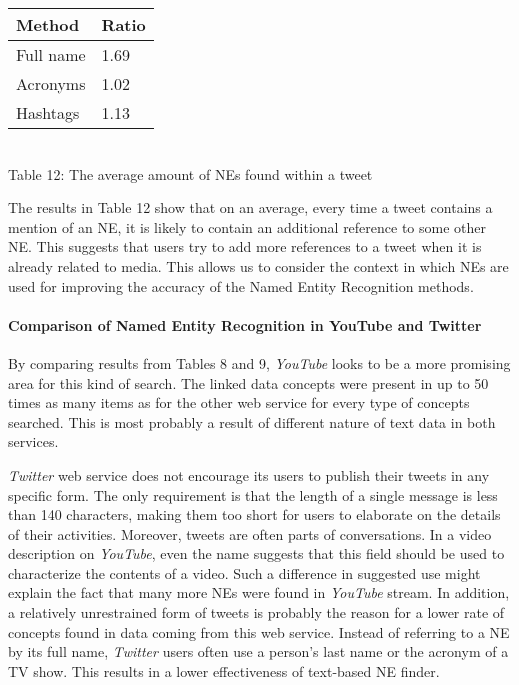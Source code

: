 \begin{center}
  \begin{tabular}{ | p{4cm} | p{2cm} | } \hline
    Method & Ratio \\ \hline
    Full name & 1.69 \\ \hline
    Acronyms & 1.02 \\ \hline
    Hashtags & 1.13 \\ \hline
  \end{tabular} \\
  Table 12: The average amount of NEs found within a tweet \\
\end{center}

The results in Table 12 show that on an average, every time a tweet contains a mention of an NE,
it is likely to contain an additional reference to some other NE. This suggests that users try to add
more references to a tweet when it is already related to media. This allows us to consider the context
in which NEs are used for improving the accuracy of the Named Entity Recognition methods.

\paragraph{Comparison of Named Entity Recognition in YouTube and Twitter}
By comparing results from Tables 8 and 9, \textit{YouTube} looks to be a more promising area for this
kind of search. The linked data concepts were present in up to 50 times as many items as for the other
web service for every type of concepts searched. This is most probably a result of different nature of
text data in both services.

\textit{Twitter} web service does not encourage its users to publish their tweets in any
specific form. The only requirement is that the length of a single message
is less than 140 characters, making them too short for users to elaborate
on the details of their activities. Moreover, tweets are often parts of
conversations. In a video description on \textit{YouTube}, even the name
suggests that this field should be used to characterize the contents
of a video. Such a difference in suggested use might explain the fact that
many more NEs were found in \textit{YouTube} stream. In addition, a relatively
unrestrained form of tweets is probably the reason for a lower rate of
concepts found in data coming from this web service. Instead of referring to
a NE by its full name, \textit{Twitter} users often use a person's
last name or the acronym of a TV show. This results in a lower effectiveness of
text-based NE finder.

